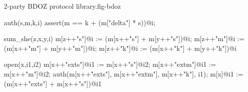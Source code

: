 \begin{fpfig}[t]{2-party BDOZ protocol library.}{fig-bdoz}
{\footnotesize{
\begin{verbatimtab}
auth(s,m,k,i) { assert(m == k + (m["delta"] * s))@i; }
  
sum_she(z,x,y,i) {
  m[z++"s"]@i := (m[x++"s"] + m[y++"s"])@i;
  m[z++"m"]@i := (m[x++"m"] + m[y++"m"])@i;
  m[z++"k"]@i := (m[x++"k"] + m[y++"k"])@i
}

open(x,i1,i2){
  m[x++"exts"]@i1 := m[x++"s"]@i2;
  m[x++"extm"]@i1 := m[x++"m"]@i2;
  auth(m[x++"exts"], m[x++"extm"], m[x++"k"], i1);
  m[x]@i1 := (m[x++"exts"] + m[x++"s"])@i1
}
\end{verbatimtab}
}}
\end{fpfig}


\begin{comment}

\begin{fpfig}[t]{2-Party BDOZ Protocol Library.}{fig-bdoz}
{\footnotesize{
  \begin{verbatimtab}
    macsum(s1,s2)
    { { share = s1.share + s2.share; mac = s1.mac + s2.mac } }
    
    maccsum(s,c)
    { { share = s.share + c; mac = s.mac + c } }
    
    macctimes(s,c)
    { { share = s.share * c; mac = s.mac * c } }
    
    macshare(w) { {  share = m[w]; mac = m[w++"mac"] } }

    mack(w) { m[w++"k"] }
    
    auth(s,m,k,i) { assert(m = k + m["delta"] * s)@i }
    
    secopen(w1,w2,w3,i1,i2)
    {
      let locsum =  macsum(macshare(w1), macshare(w2)) in
      m[w3++"s"]@i1 := (locsum.share)@i2;
      m[w3++"smac"]@i1 := (locsum.mac)@i2;
      auth(m[w3++"s"],m[w3++"smac"],mack(w1) + mack(w2),i1);
      m[w3]@i1 := (m[w3++"s"] + (locsum.share))@i1
    }

    secreveal(s,k,w,i1,i2)
    {
      p[w] = s.share@i2;
      p[w++"mac"] = s.mac@i2;
      auth(p[w],p[w++"mac"],k,i1)    
    } \end{verbatimtab}
}}
\end{fpfig}

\end{comment}
    
